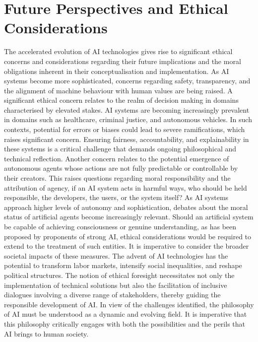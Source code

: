 \documentclass[runningheads]{llncs}
\begin{document}
\section{Future Perspectives and Ethical Considerations}
%
The accelerated evolution of AI technologies gives rise to significant ethical concerns and considerations regarding their future implications and the moral obligations inherent in their conceptualisation and implementation. As AI systems become more sophisticated, concerns regarding safety, transparency, and the alignment of machine behaviour with human values are being raised.
A significant ethical concern relates to the realm of decision making in domains characterised by elevated stakes. AI systems are becoming increasingly prevalent in domains such as healthcare, criminal justice, and autonomous vehicles. In such contexts, potential for errors or biases could lead to severe ramifications, which raises significant concern. Ensuring fairness, accountability, and explainability in these systems is a critical challenge that demands ongoing philosophical and technical reflection.
Another concern relates to the potential emergence of autonomous agents whose actions are not fully predictable or controllable by their creators. This raises questions regarding moral responsibility and the attribution of agency, if an AI system acts in harmful ways, who should be held responsible, the developers, the users, or the system itself?
As AI systems approach higher levels of autonomy and sophistication, debates about the moral status of artificial agents become increasingly relevant. Should an artificial system be capable of achieving consciousness or genuine understanding, as has been proposed by proponents of strong AI, ethical considerations would be required to extend to the treatment of such entities.
It is imperative to consider the broader societal impacts of these measures. The advent of AI technologies has the potential to transform labor markets, intensify social inequalities, and reshape political structures. The notion of ethical foresight necessitates not only the implementation of technical solutions but also the facilitation of inclusive dialogues involving a diverse range of stakeholders, thereby guiding the responsible development of AI.
In view of the challenges identified, the philosophy of AI must be understood as a dynamic and evolving field. It is imperative that this philosophy critically engages with both the possibilities and the perils that AI brings to human society.
%
%
%
%
%
\end{document}
